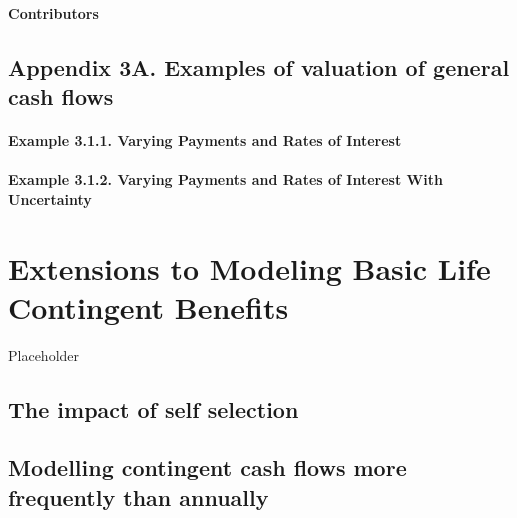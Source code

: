 \documentclass[
]{book}
\begin{document}
\hypertarget{contributors-1}{%
\subsubsection*{Contributors}\label{contributors-1}}

\hypertarget{Sec:ExamplesValCash}{%
\section{Appendix 3A. Examples of valuation of general cash flows}\label{Sec:ExamplesValCash}}

\hypertarget{example-3.1.1.-varying-payments-and-rates-of-interest}{%
\subsubsection*{Example 3.1.1. Varying Payments and Rates of Interest}\label{example-3.1.1.-varying-payments-and-rates-of-interest}}

\hypertarget{example-3.1.2.-varying-payments-and-rates-of-interest-with-uncertainty}{%
\subsubsection*{Example 3.1.2. Varying Payments and Rates of Interest With Uncertainty}\label{example-3.1.2.-varying-payments-and-rates-of-interest-with-uncertainty}}

\hypertarget{C:BenefitExt}{%
\chapter{Extensions to Modeling Basic Life Contingent Benefits}\label{C:BenefitExt}}

Placeholder

\hypertarget{the-impact-of-self-selection}{%
\section{The impact of self selection}\label{the-impact-of-self-selection}}

\hypertarget{modelling-contingent-cash-flows-more-frequently-than-annually}{%
\section{Modelling contingent cash flows more frequently than annually}\label{modelling-contingent-cash-flows-more-frequently-than-annually}}
\end{document}
